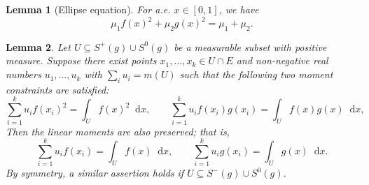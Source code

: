 \documentclass[10pt,a4paper]{amsart}
\newtheorem{lemma}{Lemma}
\newcommand{\dif}{\mathop{}\!\mathrm{d}}
\begin{document}
\begin{lemma}[Ellipse equation]\label{lemma:ellipse}
For a.e. $x\in [0,1]$, we have    
\[
\mu_1 f(x)^2 + \mu_2 g(x)^2 = \mu_1 + \mu_2. 
\]
\end{lemma}

\begin{lemma}\label{lemma:mixed-cloning}
Let $U\subseteq S^+(g)\cup S^0(g)$ be a measurable subset with positive measure. 
Suppose there exist points $x_1,\ldots,x_k\in U\cap E$ and non-negative real numbers 
$u_1, \ldots, u_k$ with $\sum_i u_i = m(U)$ such that the following two moment constraints are satisfied: 
\begin{equation}\label{eq:moment-constraints}
\sum_{i=1}^k u_i f(x_i)^2= \int_U f(x)^2 \dif{x},
\qquad
\sum_{i=1}^k u_i f(x_i)g(x_i)= \int_U f(x)g(x) \dif{x}, 
\end{equation}
Then the linear moments are also preserved; that is,
\[
\sum_{i=1}^k u_i f(x_i)= \int_U f(x) \dif{x},
\qquad
\sum_{i=1}^k u_i g(x_i)= \int_U g(x) \dif{x}.
\] 
By symmetry, a similar assertion holds if $U\subseteq S^-(g)\cup S^0(g)$.
\end{lemma}
\end{document}
